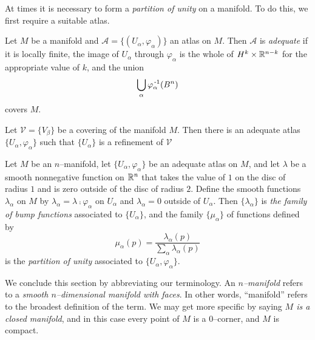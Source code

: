 At times it is necessary to form a \emph{partition of unity} on a manifold.
To do this, we first require a suitable atlas.

\begin{defn}
	\label{def:adequate}
	Let $M$ be a manifold and $\mathcal{A}=\{(U_\alpha,\varphi_\alpha)\}$ an atlas on $M$.
	Then $\mathcal{A}$ is \emph{adequate} if it is locally finite, the image of $U_\alpha$ through $\varphi_\alpha$ is the whole of $H^k\times\mathbb{R}^{n-k}$ for the appropriate value of $k$, and the union 
	\[
		\bigcup_\alpha \varphi_\alpha^{\,\text{-}1}(B^n)
	\]
	covers $M$.
\end{defn}

\begin{theorem}
	Let $\mathcal{V}=\{V_\beta\}$ be a covering of the manifold $M$.
	Then there is an adequate atlas $\{U_\alpha,\varphi_\alpha\}$ such that $\{U_\alpha\}$ is a refinement of $\mathcal{V}$
\end{theorem}

\begin{defn}
	Let $M$ be an $n$--manifold, let $\{U_\alpha,\varphi_\alpha\}$ be an adequate atlas on $M$, and let $\lambda$ be a smooth nonnegative function on $\mathbb{R}^n$ that takes the value of $1$ on the disc of radius $1$ and is zero outside of the disc of radius $2$.
	Define the smooth functions $\lambda_\alpha$ on $M$ by $\lambda_\alpha=\lambda\comp\varphi_\alpha$ on $U_\alpha$ and $\lambda_\alpha=0$ outside of $U_\alpha$.
	Then $\{\lambda_\alpha\}$ is \emph{the family of bump functions} associated to $\{U_\alpha\}$, and the family $\{\mu_\alpha\}$ of functions defined by
	\[
		\mu_\alpha(p)=\frac{\lambda_\alpha(p)}{\sum_\alpha\lambda_\alpha(p)}
	\]
	is the \emph{partition of unity} associated to $\{U_\alpha,\varphi_\alpha\}$.
\end{defn}

We conclude this section by abbreviating our terminology.
An \emph{$n$--manifold} refers to a \emph{smooth $n$--dimensional manifold with faces}.
In other words, ``manifold'' refers to the broadest definition of the term.
We may get more specific by saying \emph{$M$ is a closed manifold}, and in this case every point of $M$ is a 0--corner, and $M$ is compact.


